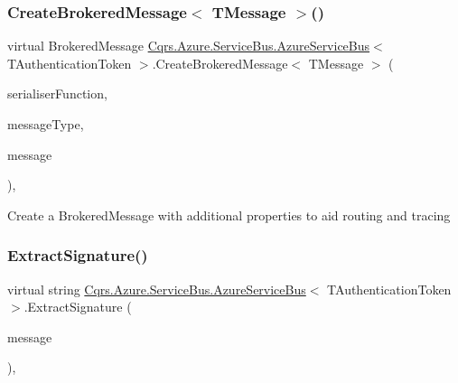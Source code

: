\subsubsection{\texorpdfstring{Create\+Brokered\+Message$<$ T\+Message $>$()}{CreateBrokeredMessage< TMessage >()}}
{\footnotesize\ttfamily virtual Brokered\+Message \hyperlink{classCqrs_1_1Azure_1_1ServiceBus_1_1AzureServiceBus}{Cqrs.\+Azure.\+Service\+Bus.\+Azure\+Service\+Bus}$<$ T\+Authentication\+Token $>$.Create\+Brokered\+Message$<$ T\+Message $>$ (\begin{DoxyParamCaption}\item[{Func$<$ T\+Message, string $>$}]{serialiser\+Function,  }\item[{Type}]{message\+Type,  }\item[{T\+Message}]{message }\end{DoxyParamCaption})\hspace{0.3cm}{\ttfamily [protected]}, {\ttfamily [virtual]}}



Create a Brokered\+Message with additional properties to aid routing and tracing 

\mbox{\label{classCqrs_1_1Azure_1_1ServiceBus_1_1AzureServiceBus_a6efd119a61f555a4a8c456f4821e83bf_a6efd119a61f555a4a8c456f4821e83bf}} 
\subsubsection{\texorpdfstring{Extract\+Signature()}{ExtractSignature()}}
{\footnotesize\ttfamily virtual string \hyperlink{classCqrs_1_1Azure_1_1ServiceBus_1_1AzureServiceBus}{Cqrs.\+Azure.\+Service\+Bus.\+Azure\+Service\+Bus}$<$ T\+Authentication\+Token $>$.Extract\+Signature (\begin{DoxyParamCaption}\item[{Brokered\+Message}]{message }\end{DoxyParamCaption})\hspace{0.3cm}{\ttfamily [protected]}, {\ttfamily [virtual]}}



